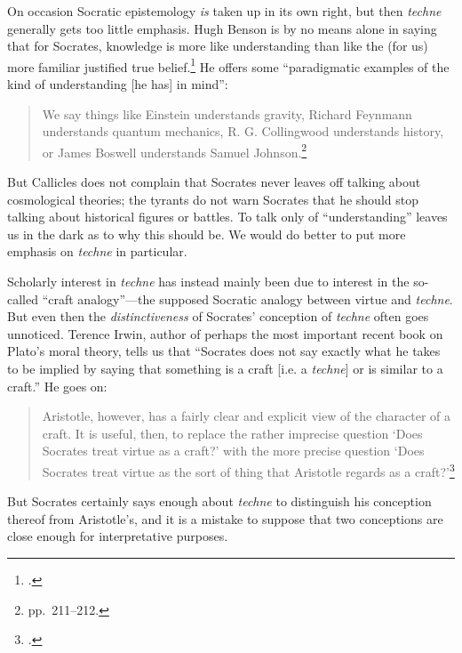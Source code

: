 ﻿\documentclass[11pt]{amsart}
\begin{document}
On occasion Socratic epistemology \emph{is} taken up in its own right, but then \emph{techne} generally gets too little emphasis. Hugh Benson is by no means alone in saying that for Socrates, knowledge is more like understanding than like the (for us) more familiar justified true belief.\footnote{\citet[11]{benson2000swm}.} He offers some ``paradigmatic examples of the kind of understanding [he has] in mind'':\small\begin{quote}We say things like Einstein understands gravity, Richard Feynmann understands quantum mechanics, R. G. Collingwood understands history, or James Boswell understands Samuel Johnson.\footnote{pp.~211--212.}\end{quote}\normalsize But Callicles does not complain that Socrates never leaves off talking about cosmological theories; the tyrants do not warn Socrates that he should stop talking about historical figures or battles. To talk only of ``understanding'' leaves us in the dark as to why this should be. We would do better to put more emphasis on \emph{techne} in particular.

Scholarly interest in \emph{techne} has instead mainly been due to interest in the so-called ``craft analogy''---the supposed Socratic analogy between virtue and \emph{techne}. But even then the \emph{distinctiveness} of Socrates' conception of \emph{techne} often goes unnoticed. Terence Irwin, author of perhaps the most important recent book on Plato's moral theory, tells us that ``Socrates does not say exactly what he takes to be implied by saying that something is a craft [i.e. a \emph{techne}] or is similar to a craft.'' He goes on:\small\begin{quote}Aristotle, however, has a fairly clear and explicit view of the character of a craft. It is useful, then, to replace the rather imprecise question `Does Socrates treat virtue as a craft?' with the more precise question `Does Socrates treat virtue as the sort of thing that Aristotle regards as a craft?'\footnote{\citet[70]{irwin1995pse}.}\end{quote}\normalsize But Socrates certainly says enough about \emph{techne} to distinguish his conception thereof from Aristotle's, and it is a mistake to suppose that two conceptions are close enough for interpretative purposes.


\end{document}

